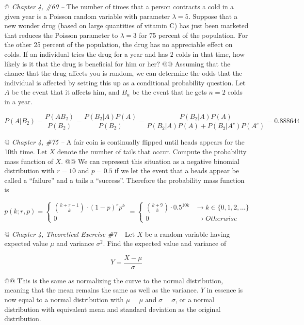 \documentclass[10pt]{article}
\begin{document}
\begin{easylist}[enumerate]
    @ \textit{Chapter 4, \#60 --} The number of times that a person contracts a cold in a given year is a Poisson random
    variable with parameter $\lambda = 5$. Suppose that a new wonder drug (based on large quantities of vitamin C) has
    just been marketed that reduces the Poisson parameter to $\lambda = 3$ for 75 percent of the population. For the
    other 25 percent of the population, the drug has no appreciable effect on colds. If an individual tries the drug for
    a year and has 2 colds in that time, how likely is it that the drug is beneficial for him or her?
    @@ Assuming that the chance that the drug affects you is random, we can determine the odds that the individual is
    affected by setting this up as a conditional probability question. Let $A$ be the event that it affects him, and
    $B_n$ be the event that he gets $n = 2$ colds in a year.

    \[
        P(A|B_2) = \frac{P(AB_2)}{P(B_2)} =
        \frac{P(B_2|A)P(A)}{P(B_2)} =
        \frac{P(B_2|A)P(A)}{P(B_2 | A)P(A) + P(B_2|A^c)P(A^c)} =
        \boxed{0.888644}
    \]

    @ \textit{Chapter 4, \#75 --} A fair coin is continually flipped until heads appears for the 10th time. Let $X$
    denote the number of tails that occur. Compute the probability mass function of $X$.
    @@ We can represent this situation as a negative binomial distribution with $r = 10$ and $p=0.5$ if we let the event
    that a heads appear be called a ``failure'' and a tails a ``success''. Therefore the probability mass function is

    \[
        p(k;r,p) =
        \begin{cases}
            \binom{k + r - 1}{k} \cdot {(1-p)}^r p^k\\
            0
        \end{cases} =
        \begin{cases}
            \binom{k + 9}{k} \cdot 0.5^{10k} &\to k \in \{0, 1, 2, \ldots\}\\
            0 &\to Otherwise
        \end{cases}
    \]

    @ \textit{Chapter 4, Theoretical Exercise \#7 --} Let $X$ be a random variable having expected value $\mu$ and
    variance $\sigma^2$. Find the expected value and variance of

    \[ Y = \frac{X - \mu}{\sigma} \]

    @@ This is the same as normalizing the curve to the normal distribution, meaning that the mean remains the same as
    well as the variance. $Y$ in essence is now equal to a normal distribution with $\mu=\mu$ and $\sigma=\sigma$, or
    a normal distribution with equivalent mean and standard deviation as the original distribution.


\end{easylist}
\end{document}
